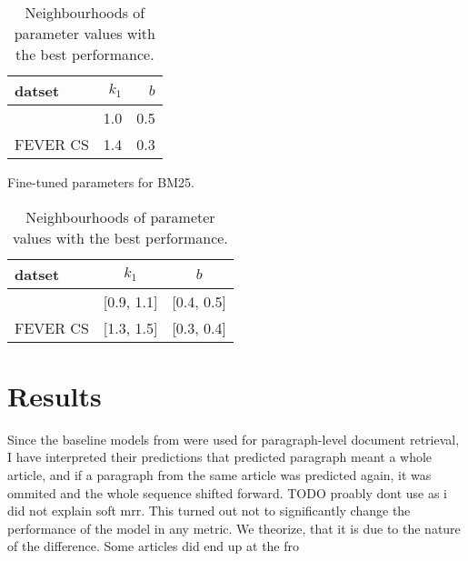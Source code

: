 \begin{table}[!htb]
    \centering
    \begin{minipage}[t]{.47\textwidth}    
        \centering
        \begin{tabular}{lrr}
            datset & $k_1$ & $b$ \\
            \midrule
            \CTK{} & 1.0 & 0.5 \\
            FEVER CS & 1.4 & 0.3
        \end{tabular}
        \caption[BM25 Fine-tuned Parameters]{Fine-tuned parameters for BM25.}
        \label{tab:bm25_finetune}
    \end{minipage}
    \hfill
    \begin{minipage}[t]{.47\textwidth}
        \centering
        \begin{tabular}{lcc}
            datset & $k_1$ & $b$ \\
            \midrule
            \CTK{} & [0.9, 1.1] & [0.4, 0.5] \\
            FEVER CS & [1.3, 1.5] & [0.3, 0.4]
        \end{tabular}
        \caption[BM25 Promising Parameter Sets]{Neighbourhoods of parameter values with the best performance.}
        \label{tab:bm25_sets}
    \end{minipage}
\end{table}

\section{Results}

Since the baseline models from \citet{rypar} were used for paragraph-level document retrieval, I have interpreted their predictions that predicted paragraph meant a whole article, and if a paragraph from the same article was predicted again, it was ommited and the whole sequence shifted forward. TODO proably dont use as i did not explain soft mrr. This turned out not to significantly change the performance of the model in any metric. We theorize, that it is due to the nature of the difference. Some articles did end up at the fro

